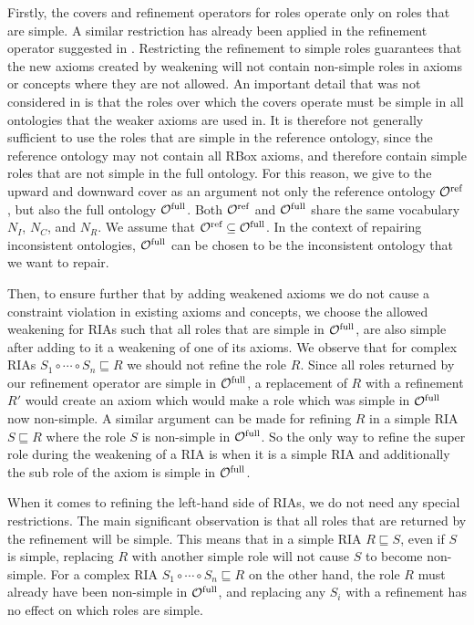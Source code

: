 \documentclass[
]{ceurart}
\begin{document}
Firstly, the covers and refinement operators for roles operate only on roles that are simple. A similar restriction has already been applied in the refinement operator suggested in \cite{confalonieri2020towards}. Restricting the refinement to simple roles guarantees that the new axioms created by weakening will not contain non-simple roles in axioms or concepts where they are not allowed. An important detail that was not considered in \cite{confalonieri2020towards} is that the roles over which the covers operate must be simple in all ontologies that the weaker axioms are used in. It is therefore not generally sufficient to use the roles that are simple in the reference ontology, since the reference ontology may not contain all RBox axioms, and therefore contain simple roles that are not simple in the full ontology. For this reason, we give to the upward and downward cover as an argument not only the reference ontology ${\mathcal{O}^\textnormal{ref}}$, but also the full ontology ${\mathcal{O}^\textnormal{full}}$. Both ${\mathcal{O}^\textnormal{ref}}$ and ${\mathcal{O}^\textnormal{full}}$ share the same vocabulary $N_I$, $N_C$, and $N_R$. We assume that ${\mathcal{O}^\textnormal{ref}} \subseteq {\mathcal{O}^\textnormal{full}}$. In the context of repairing inconsistent ontologies, ${\mathcal{O}^\textnormal{full}}$ can be chosen to be the inconsistent ontology that we want to repair.

Then, to ensure further that by adding weakened axioms we do not cause a constraint violation in existing axioms and concepts, we choose the allowed weakening for RIAs such that all roles that are simple in ${\mathcal{O}^\textnormal{full}}$, are also simple after adding to it a weakening of one of its axioms. We observe that for complex RIAs $S_1 \circ \cdots \circ S_n \sqsubseteq R$ we should not refine the role $R$. Since all roles returned by our refinement operator are simple in ${\mathcal{O}^\textnormal{full}}$,  a replacement of $R$ with a refinement $R'$ would create an axiom which would make a role which was simple in ${\mathcal{O}^\textnormal{full}}$ now non-simple. A similar argument can be made for refining $R$ in a simple RIA $S \sqsubseteq R$ where the role $S$ is non-simple in ${\mathcal{O}^\textnormal{full}}$. So the only way to refine the super role during the weakening of a RIA is when it is a simple RIA and additionally the sub role of the axiom is simple in ${\mathcal{O}^\textnormal{full}}$.

When it comes to refining the left-hand side of RIAs, we do not need any special restrictions. The main significant observation is that all roles that are returned by the refinement will be simple. This means that in a simple RIA $R \sqsubseteq S$, even if $S$ is simple, replacing $R$ with another simple role will not cause $S$ to become non-simple. For a complex RIA $S_1 \circ \cdots \circ S_n \sqsubseteq R$ on the other hand, the role $R$ must already have been non-simple in ${\mathcal{O}^\textnormal{full}}$, and replacing any $S_i$ with a refinement has no effect on which roles are simple.
\end{document}
